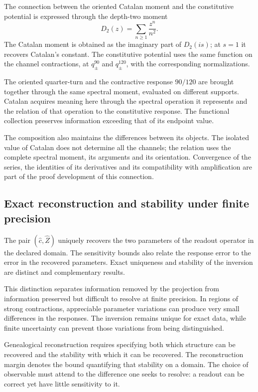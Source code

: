 The connection between the oriented Catalan moment and the constitutive
potential is expressed through the depth-two moment
\begin{equation}
 D_2(z)=\sum_{n\geq1}\frac{z^n}{n^2}.
 \label{eq:narrativa-momento-dos}
\end{equation}
The Catalan moment is obtained as the imaginary part of
$D_2(is)$; at $s=1$ it recovers Catalan's constant. The constitutive
potential uses the same function on the channel contractions,
at $q_\pm^{90}$ and $q_\pm^{120}$, with the corresponding
normalizations.

The oriented quarter-turn and the contractive response $90/120$
are brought together through the same spectral moment, evaluated on
different supports. Catalan acquires meaning here through the
spectral operation it represents and the relation of that
operation to the constitutive response. The functional collection
preserves information exceeding that of its endpoint value.

The composition also maintains the differences between its objects.
The isolated value of Catalan does not determine all the channels;
the relation uses the complete spectral moment, its arguments
and its orientation. Convergence of the series, the identities
of its derivatives and its compatibility with amplification are
part of the proof development of this connection.

\subsection{Exact reconstruction and stability under finite precision}
\label{subsec:narrativa-estabilidad-restitucion}

The pair $(\widehat c,\widehat Z)$ uniquely recovers the two
parameters of the readout operator in the declared domain. The sensitivity
bounds also relate the response error to the error in the
recovered parameters. Exact uniqueness and
stability of the inversion are distinct and
complementary results.

This distinction separates information removed by the projection
from information preserved but difficult to resolve at finite
precision. In regions of strong contractions, appreciable parameter
variations can produce very small differences in the
responses. The inversion remains unique for exact data,
while finite uncertainty can prevent those
variations from being distinguished.

Genealogical reconstruction requires specifying both which structure
can be recovered and the stability with which it can be recovered.
The reconstruction margin denotes the bound quantifying that stability
on a domain. The choice of observable must attend to the difference
one seeks to resolve: a readout can be correct yet have
little sensitivity to it.


